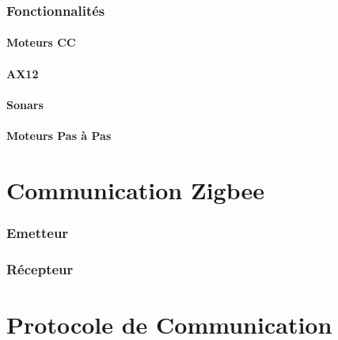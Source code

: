 \documentclass{article}
\begin{document}
		\section{Fonctionnalités}
			\subsection{Moteurs CC}
			\subsection{AX12}
			\subsection{Sonars}
			\subsection{Moteurs Pas à Pas}

		\section{}
	\newpage
	\part{Communication Zigbee}
	\setcounter{section}{0}
		\section{Emetteur}
			\subsection{}
		\section{Récepteur}

	\part{Protocole de Communication}
			
		
	
	
\end{document}
